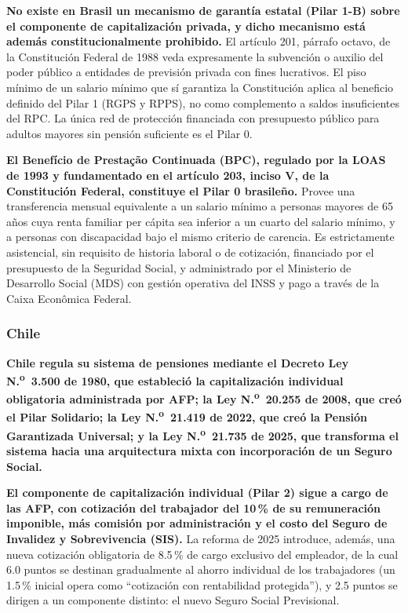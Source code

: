 \documentclass[12pt, letterpaper]{article}
\begin{document}
\textbf{No existe en Brasil un mecanismo de garantía estatal (Pilar 1-B) sobre el componente de capitalización privada, y dicho mecanismo está además constitucionalmente prohibido.} El artículo 201, párrafo octavo, de la Constitución Federal de 1988 veda expresamente la subvención o auxilio del poder público a entidades de previsión privada con fines lucrativos. El piso mínimo de un salario mínimo que sí garantiza la Constitución aplica al beneficio definido del Pilar 1 (RGPS y RPPS), no como complemento a saldos insuficientes del RPC. La única red de protección financiada con presupuesto público para adultos mayores sin pensión suficiente es el Pilar 0.

\textbf{El Benefício de Prestação Continuada (BPC), regulado por la LOAS de 1993 y fundamentado en el artículo 203, inciso V, de la Constitución Federal, constituye el Pilar 0 brasileño.} Provee una transferencia mensual equivalente a un salario mínimo a personas mayores de 65 años cuya renta familiar per cápita sea inferior a un cuarto del salario mínimo, y a personas con discapacidad bajo el mismo criterio de carencia. Es estrictamente asistencial, sin requisito de historia laboral o de cotización, financiado por el presupuesto de la Seguridad Social, y administrado por el Ministerio de Desarrollo Social (MDS) con gestión operativa del INSS y pago a través de la Caixa Econômica Federal.

\subsubsection{Chile}

\textbf{Chile regula su sistema de pensiones mediante el Decreto Ley N.\textsuperscript{o}~3.500 de 1980, que estableció la capitalización individual obligatoria administrada por AFP; la Ley N.\textsuperscript{o}~20.255 de 2008, que creó el Pilar Solidario; la Ley N.\textsuperscript{o}~21.419 de 2022, que creó la Pensión Garantizada Universal; y la Ley N.\textsuperscript{o}~21.735 de 2025, que transforma el sistema hacia una arquitectura mixta con incorporación de un Seguro Social.}

\textbf{El componente de capitalización individual (Pilar 2) sigue a cargo de las AFP, con cotización del trabajador del 10\,\% de su remuneración imponible, más comisión por administración y el costo del Seguro de Invalidez y Sobrevivencia (SIS).} La reforma de 2025 introduce, además, una nueva cotización obligatoria de 8.5\,\% de cargo exclusivo del empleador, de la cual 6.0 puntos se destinan gradualmente al ahorro individual de los trabajadores (un 1.5\,\% inicial opera como ``cotización con rentabilidad protegida''), y 2.5 puntos se dirigen a un componente distinto: el nuevo Seguro Social Previsional.
\end{document}
